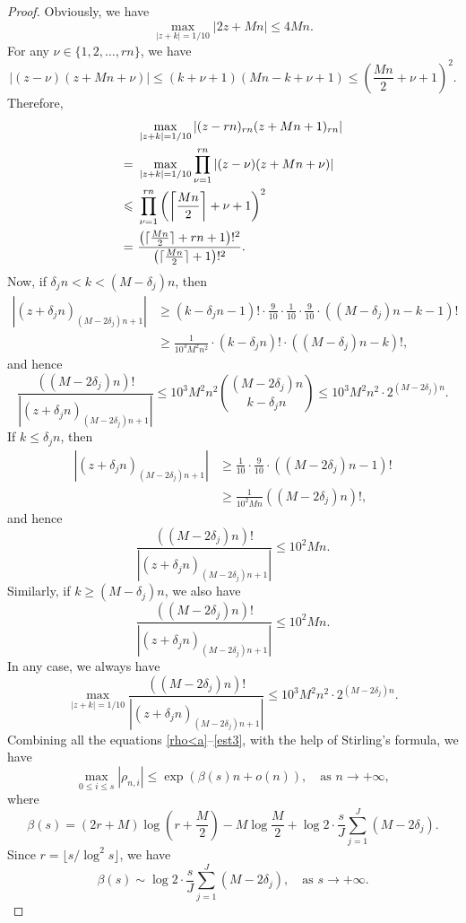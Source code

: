 \documentclass[12pt]{article}
\numberwithin{equation}{section}
\begin{document}
\begin{proof}
Obviously, we have
\begin{equation}\label{est1}
	\max_{|z+k| = 1/10} |2z+Mn| \leqslant 4Mn.
\end{equation}
For any $\nu \in \{1,2,\ldots,rn\}$, we have
\[ |(z-\nu)(z+Mn+\nu)| \leqslant (k+\nu+1)(Mn-k+\nu+1) \leqslant \left( \frac{Mn}{2} + \nu + 1 \right)^2. \]
Therefore, 
\begin{align}
&~\max_{|z+k| = 1/10} |(z-rn)_{rn} (z+Mn+1)_{rn}| \notag\\
=&~ \max_{|z+k| = 1/10} \prod_{\nu=1}^{rn} |(z-\nu)(z+Mn+\nu)| \notag\\
\leqslant&~ \prod_{\nu=1}^{rn} \left( \left\lceil\frac{Mn}{2}\right\rceil + \nu + 1 \right)^2 \notag\\
=&~ \frac{\left(\lceil \frac{Mn}{2} \rceil + rn +1\right)!^2}{\left( \lceil\frac{Mn}{2}\rceil + 1 \right)!^2}. \label{est2}
\end{align}
Now, if $\delta_jn < k < (M-\delta_j)n$, then
\begin{align*}
|(z+\delta_jn)_{(M-2\delta_j)n+1}| &\geqslant (k-\delta_jn-1)! \cdot \frac{9}{10} \cdot \frac{1}{10} \cdot \frac{9}{10} \cdot ((M-\delta_j)n-k-1)! \\
&\geqslant \frac{1}{10^3M^2n^2} \cdot (k-\delta_jn)! \cdot ((M-\delta_j)n-k)!,
\end{align*}
and hence
\[ \frac{((M-2\delta_j)n)!}{|(z+\delta_jn)_{(M-2\delta_j)n+1}|} \leqslant 10^3M^2n^2 \binom{(M-2\delta_j)n}{k-\delta_jn} \leqslant 10^3M^2n^2 \cdot 2^{(M-2\delta_j)n}. \]
If $k \leqslant \delta_j n$, then 
\begin{align*}
|(z+\delta_jn)_{(M-2\delta_j)n+1}| &\geqslant \frac{1}{10} \cdot \frac{9}{10} \cdot ((M-2\delta_j)n-1)! \\
&\geqslant \frac{1}{10^2Mn} ((M-2\delta_j)n)!,
\end{align*}
and hence
\[ \frac{((M-2\delta_j)n)!}{|(z+\delta_jn)_{(M-2\delta_j)n+1}|} \leqslant 10^2Mn. \]
Similarly, if $k \geqslant (M-\delta_j)n$, we also have
\[ \frac{((M-2\delta_j)n)!}{|(z+\delta_jn)_{(M-2\delta_j)n+1}|} \leqslant 10^2Mn. \]
In any case, we always have
\begin{equation}\label{est3}
	\max_{|z+k| = 1/10} \frac{((M-2\delta_j)n)!}{|(z+\delta_jn)_{(M-2\delta_j)n+1}|} \leqslant 10^3M^2n^2 \cdot 2^{(M-2\delta_j)n}.
\end{equation}
Combining all the equations \eqref{rho<a}--\eqref{est3}, with the help of Stirling's formula, we have
\[ \max_{0 \leqslant i \leqslant s} |\rho_{n,i}| \leqslant \exp\left( \beta(s)n + o(n) \right), \quad \text{as~} n \to +\infty,  \]
where
\[ \beta(s) = \left(2r + M \right)\log\left(r+\frac{M}{2} \right) - M\log\frac{M}{2} + \log2 \cdot \frac{s}{J} \sum_{j=1}^{J} (M-2\delta_j). \]
Since $r = \lfloor s/\log^2 s \rfloor$, we have
\[ \beta(s) \sim \log2 \cdot \frac{s}{J} \sum_{j=1}^{J} (M-2\delta_j), \quad \text{as~} s \to +\infty. \]
\end{proof}
\end{document}
